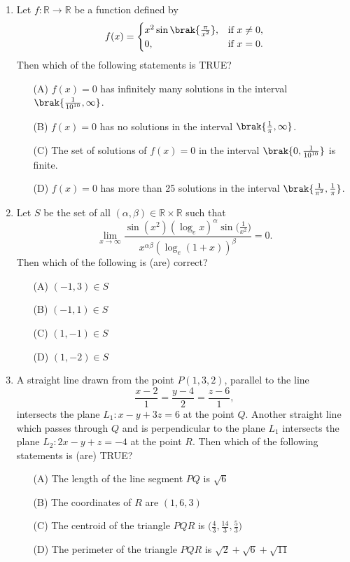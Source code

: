 \documentclass[12pt,a4paper]{article}
\begin{document}
\begin{enumerate}
    \item Let $ f : \mathbb{R} \to \mathbb{R} $ be a function defined by  
\[
    f(x) =
    \begin{cases} 
        x^2 \sin \brak{ \frac{\pi}{x^2} }, & \text{if } x \neq 0, \\
        0, & \text{if } x = 0.
    \end{cases}
\]
    Then which of the following statements is TRUE?  
    \begin{itemize}
        \item[(A)] $ f(x) = 0 $ has infinitely many solutions in the interval $ \brak{ \frac{1}{10^{10}}, \infty } $.
        \item[(B)] $ f(x) = 0 $ has no solutions in the interval $ \brak{ \frac{1}{\pi}, \infty } $.
        \item[(C)] The set of solutions of $ f(x) = 0 $ in the interval $ \brak{ 0, \frac{1}{10^{10}} } $ is finite.
        \item[(D)] $ f(x) = 0 $ has more than 25 solutions in the interval $ \brak{ \frac{1}{\pi^2}, \frac{1}{\pi} } $.
    \end{itemize}
\item Let $S$ be the set of all $(\alpha, \beta) \in \mathbb{R} \times \mathbb{R}$ such that
\[
\lim_{x \to \infty} \frac{\sin(x^2)(\log_e x)^{\alpha} \sin\bigg(\frac{1}{x^2}\bigg)}{x^{\alpha \beta} (\log_e(1+x))^{\beta}} = 0.
\]
Then which of the following is (are) correct?

\begin{itemize}
    \item[(A)] $(-1,3) \in S$
    \item[(B)] $(-1,1) \in S$
    \item[(C)] $(1,-1) \in S$
    \item[(D)] $(1,-2) \in S$
\end{itemize}

\item A straight line drawn from the point $P(1,3,2)$, parallel to the line
\[
\frac{x - 2}{1} = \frac{y - 4}{2} = \frac{z - 6}{1},
\]
intersects the plane $L_1: x - y + 3z = 6$ at the point $Q$. Another straight line which passes through $Q$ and is perpendicular to the plane $L_1$ intersects the plane $L_2: 2x - y + z = -4$ at the point $R$. Then which of the following statements is (are) TRUE?

\begin{itemize}
    \item[(A)] The length of the line segment $PQ$ is $\sqrt{6}$
    \item[(B)] The coordinates of $R$ are $(1,6,3)$
    \item[(C)] The centroid of the triangle $PQR$ is $\bigg( \frac{4}{3}, \frac{14}{3}, \frac{5}{3} \bigg)$
    \item[(D)] The perimeter of the triangle $PQR$ is $\sqrt{2} + \sqrt{6} + \sqrt{11}$
\end{itemize}


\end{enumerate}
\end{document}
